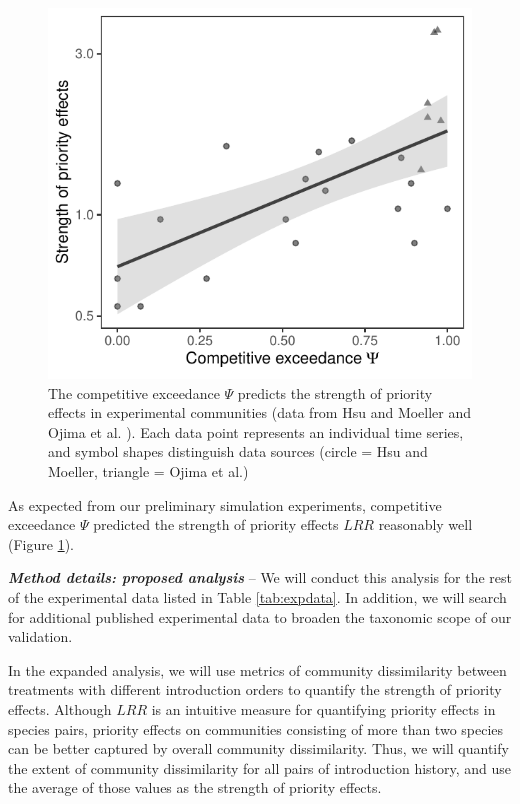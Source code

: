 \documentclass[12pt, class=article, crop=false]{standalone}
\begin{document}
\begin{figure}
    \includegraphics[scale=0.6]{output/figure_exp.pdf}
    \caption{The competitive exceedance $\Psi$ predicts the strength of priority effects in experimental communities (data from Hsu and Moeller \citep{hsu_metabolic_2021} and Ojima et al. \citep{ojima_priority_2022}).
    Each data point represents an individual time series, and symbol shapes distinguish data sources (circle = Hsu and Moeller, triangle = Ojima et al.)}
    \label{fig:experiment}
\end{figure}

As expected from our preliminary simulation experiments, competitive exceedance $\Psi$ predicted the strength of priority effects $LRR$ reasonably well (Figure \ref{fig:experiment}).

\textit{\textbf{Method details: proposed analysis}} --
We will conduct this analysis for the rest of the experimental data listed in Table \ref{tab:expdata}.
In addition, we will search for additional published experimental data to broaden the taxonomic scope of our validation.

In the expanded analysis, we will use metrics of community dissimilarity between treatments with different introduction orders to quantify the strength of priority effects.
Although $LRR$ is an intuitive measure for quantifying priority effects in species pairs, priority effects on communities consisting of more than two species can be better captured by overall community dissimilarity.
Thus, we will quantify the extent of community dissimilarity for all pairs of introduction history, and use the average of those values as the strength of priority effects.
\end{document}
